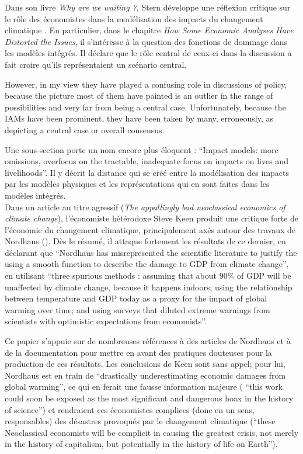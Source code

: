 Dans son livre \emph{Why are we waiting ?}, Stern développe une réflexion critique sur le rôle des économistes dans la modélisation des impacts du changement climatique \textcite{stern_why_2015}.   En particulier, dans le chapitre \emph{How Some Economic Analyses Have Distorted the Issues}, il s'intéresse à la question des fonctions de dommage dans les modèles intégrés. Il déclare que le rôle central de ceux-ci dans la discussion a fait croire qu'ils représentaient un scénario central.

\begin{authoredquote}
    However, in my view they have played a confusing role in discussions of policy, because the picture most of them have painted is an outlier in the range of possibilities and very far from being a central case. Unfortunately, because the IAMs have been prominent, they have been taken by many, erroneously, as depicting a central case or overall consensus.
\end{authoredquote}

Une sous-section porte un nom encore plus éloquent : \enquote{Impact models: more omissions, overfocus on the tractable, inadequate focus on impacts on lives and livelihoods}. Il y décrit la distance qui se créé entre la modélisation des impacts par les modèles physiques et les représentations qui en sont faites dans les modèles intégrés. \\

Dans un article au titre agressif (\emph{The appallingly bad neoclassical economics of climate change}), l'économiste hétérodoxe Steve Keen produit une critique forte de l'économie du changement climatique, principalement axés autour des travaux de Nordhaus (\textcite{keen_appallingly_2021}). Dès le résumé, il attaque fortement les résultats de ce dernier, en déclarant que \enquote{Nordhaus has misrepresented the scientific literature to justify the using a smooth function to describe the damage to GDP from climate change}, en utilisant \enquote{three spurious methods : assuming that about 90\% of GDP will be unaffected by climate change, because it happens indoors; using the relationship between temperature and GDP today as a proxy for the impact of global warming over time; and using surveys that diluted extreme warnings from scientists with optimistic expectations from economists}. 

Ce papier s'appuie sur de nombreuses références à des articles de Nordhaus et à de la documentation pour mettre en avant des pratiques douteuses pour la production de ces résultats. Les conclusions de Keen sont sans appel; pour lui, Nordhaus est en train de \enquote{drastically underestimating economic damages from global warming}, ce qui en ferait une fausse information majeure ( \enquote{this work could soon be exposed as the most significant and dangerous hoax in the history of science})  et rendraient ces économistes complices (donc en un sens, responsables) des désastres provoqués par le changement climatique (\enquote{these Neoclassical economists will be complicit in causing the greatest crisis, not merely in the history of capitalism, but potentially in the history of life on Earth}).

